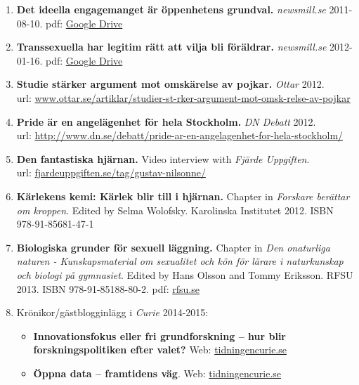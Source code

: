 \documentclass[10pt]{article}
\begin{document}
\begin{enumerate}[nolistsep]
\item {\bf Det ideella engagemanget är öppenhetens grundval.} \emph{newsmill.se} 2011-08-10.
pdf: \href{https://drive.google.com/open?id=0B79wnU8V_RoiVHRELWtPc0tSdGs}{Google Drive}
\item {\bf Transsexuella har legitim rätt att vilja bli föräldrar.} \emph{newsmill.se} 2012-01-16.
pdf: \href{https://drive.google.com/open?id=0B79wnU8V_Roic1QySHZnRHJqY3c}{Google Drive}
\item {\bf Studie stärker argument mot omskärelse av pojkar.} \emph{Ottar} 2012.\\
url: \href{http://www.ottar.se/artiklar/studier-st-rker-argument-mot-omsk-relse-av-pojkar}{www.ottar.se/artiklar/studier-st-rker-argument-mot-omsk-relse-av-pojkar}
\item {\bf Pride är en angelägenhet för hela Stockholm.} \emph{DN Debatt} 2012.\\
url: \href{http://www.dn.se/debatt/pride-ar-en-angelagenhet-for-hela-stockholm/}{http://www.dn.se/debatt/pride-ar-en-angelagenhet-for-hela-stockholm/}
\item {\bf Den fantastiska hjärnan.} Video interview with \emph{Fjärde Uppgiften}.\\
url: \href{http://fjardeuppgiften.se/tag/gustav-nilsonne/}{fjardeuppgiften.se/tag/gustav-nilsonne/}
\item {\bf Kärlekens kemi: Kärlek blir till i hjärnan.} Chapter in \emph{Forskare berättar om kroppen}. Edited by Selma Wolofsky. Karolinska Institutet 2012. ISBN 978-91-85681-47-1
\item {\bf Biologiska grunder för sexuell läggning.} Chapter in \emph{Den onaturliga naturen - Kunskapsmaterial om sexualitet och kön för lärare i naturkunskap och biologi på gymnasiet}. Edited by Hans Olsson and Tommy Eriksson. RFSU 2013. ISBN 978-91-85188-80-2.
pdf: \href{http://www.rfsu.se/Bildbank/Dokument/Metod-Handledning/Den\%20onaturliga\%20naturen_MQ2.pdf?epslanguage=sv}{rfsu.se}
\item Krönikor/gästblogginlägg i \emph{Curie} 2014-2015:
	\begin{itemize}[nolistsep]
	\item {\bf Innovationsfokus eller fri grundforskning – hur blir forskningspolitiken efter valet?} Web: \href{https://www.tidningencurie.se/kronikor/innovationsfokus-eller-fri-grundforskning---hur-blir-forskningspolitiken-efter-valet}{tidningencurie.se}
	\item {\bf Öppna data – framtidens väg}. Web: \href{https://www.tidningencurie.se/kronikor/oppna-data---framtidens-vag}{tidningencurie.se}

\end{itemize}
\end{enumerate}
\end{document}
